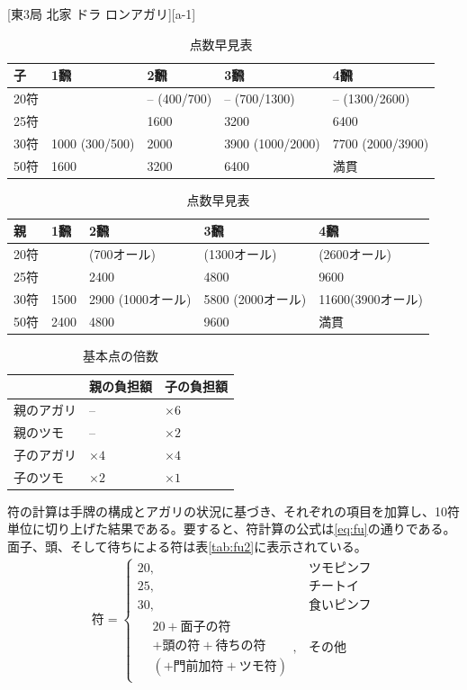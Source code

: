 \documentclass[10pt, twocolumn, notitlepage]{report}
\newlength\stdbls %
\begin{document}
[東3局 北家 ドラ  ロンアガリ][a-1]

\begin{table}[!b]
  \centering
  \begin{tabular}{l|llll}
    子 & 1飜 & 2飜 & 3飜 & 4飜 \\
    \hline
    20符 & & -- (400/700) & -- (700/1300) & -- (1300/2600) \\
    25符 & & 1600 & 3200 & 6400 \\
    30符 & 1000 (300/500) & 2000 & 3900 (1000/2000) & 7700 (2000/3900) \\
    50符 & 1600 & 3200 & 6400 & 満貫 \\
  \end{tabular}
  
  \vspace{\stdbls}
  
  \centering
  \begin{tabular}{l|llll}
    親 & 1飜 & 2飜 & 3飜 & 4飜 \\
    \hline
    20符 & & (700オール) & (1300オール) & (2600オール) \\
    25符 & & 2400 & 4800 & 9600 \\
    30符 & 1500 & 2900 (1000オール) & 5800 (2000オール) & 11600(3900オール) \\
    50符 & 2400 & 4800 & 9600 & 満貫 \\
  \end{tabular}
  \caption{点数早見表}
  \label{tab:fu}
\end{table}

\begin{table}[ht]
  \centering
  \begin{tabular}{lll}
     & 親の負担額 & 子の負担額 \\
    \hline
    親のアガリ & -- & $\times 6$ \\
    親のツモ & -- & $\times 2$ \\
    子のアガリ & $\times 4$ & $\times 4$ \\
    子のツモ & $\times 2$ & $\times 1$ \\
  \end{tabular}
  \caption{基本点の倍数}
  \label{tab:multiply}
\end{table}

符の計算は手牌の構成とアガリの状況に基づき、それぞれの項目を加算し、10符単位に切り上げた結果である。要すると、符計算の公式は\eqref{eq:fu}の通りである。面子、頭、そして待ちによる符は表\ref{tab:fu2}に表示されている。
%
\begin{align}
  \text{符} = \begin{cases} 20, & \text{ツモピンフ} \\ 25, & \text{チートイ} \\ 30, & \text{食いピンフ} \\ \begin{aligned} &20 + \text{面子の符} \\ &+ \text{頭の符} + \text{待ちの符} \\ &(+ \text{門前加符} + \text{ツモ符}) \end{aligned}, & \text{その他} \end{cases} \label{eq:fu}
\end{align}
\end{document}
